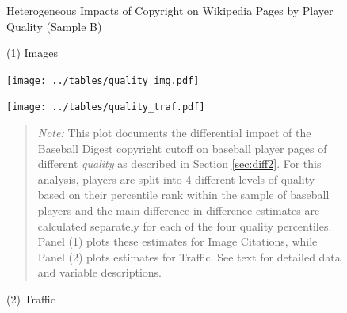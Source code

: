 \begin{figure}[!htbp]
\begin{center}
\caption{Heterogeneous Impacts of Copyright on Wikipedia Pages by Player Quality (Sample B)}
\label{fig:quality}
\vspace{5mm}
\caption*{\small{(1) Images}}
\texttt{[image: ../tables/quality\_img.pdf]}\\
\vspace{5mm}
\caption*{\small{(2) Traffic}}
\texttt{[image: ../tables/quality\_traf.pdf]}

\end{center}
\begin{quote}
\emph{Note:} This plot documents the differential impact of the Baseball Digest copyright cutoff on baseball player pages of different \emph{quality} as described in Section \ref{sec:diff2}. For this analysis, players are split into 4 different levels of quality based on their percentile rank within the sample of baseball players and the main difference-in-difference estimates are calculated separately for each of the four quality percentiles. Panel (1) plots these estimates for Image Citations, while Panel (2) plots estimates for Traffic. See text for detailed data and variable descriptions.




\end{quote}
\end{figure}



\appendix

\setcounter{table}{0}
\setcounter{figure}{0}

